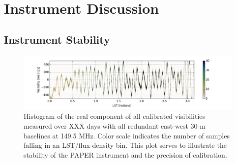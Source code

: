 \documentclass[twocolumn,numberedappendix]{emulateapj} \shorttitle{PSA64}
\begin{document}
%



\section{Instrument Discussion}\label{sec:instrument}
\subsection{Instrument Stability}

\begin{figure}[!t]
\centering
\includegraphics[width=2.3\columnwidth]{plots/density.png}
\caption{Histogram of the real component of 
all calibrated visibilities measured over XXX days with all redundant east-west 30-m 
baselines at 149.5 MHz. 
Color scale indicates the number of samples falling in an LST/flux-density bin.
This plot serves to illustrate the stability of the PAPER instrument and the precision
of calibration.
}\label{fig:density}
\end{figure}
\end{document}

